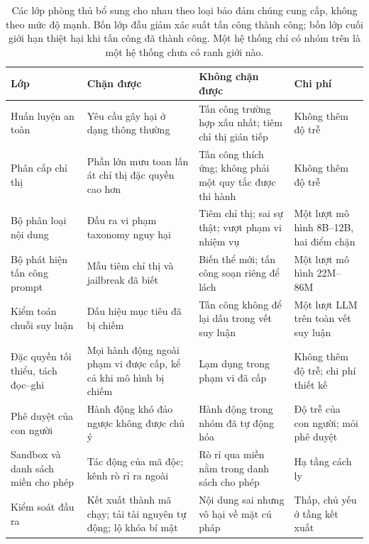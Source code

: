 \begin{table}[H]
\centering
\small
\begin{tabularx}{\textwidth}{>{\raggedright\arraybackslash}p{2.9cm} >{\raggedright\arraybackslash}X >{\raggedright\arraybackslash}X >{\raggedright\arraybackslash}p{2.6cm}}
\toprule
\textbf{Lớp} & \textbf{Chặn được} & \textbf{Không chặn được} & \textbf{Chi phí} \\
\midrule
Huấn luyện an toàn & Yêu cầu gây hại ở dạng thông thường & Tấn công trường hợp xấu nhất; tiêm chỉ thị gián tiếp & Không thêm độ trễ \\
\addlinespace
Phân cấp chỉ thị & Phần lớn mưu toan lấn át chỉ thị đặc quyền cao hơn & Tấn công thích ứng; không phải một quy tắc được thi hành & Không thêm độ trễ \\
\addlinespace
Bộ phân loại nội dung & Đầu ra vi phạm taxonomy nguy hại & Tiêm chỉ thị; sai sự thật; vượt phạm vi nhiệm vụ & Một lượt mô hình 8B--12B, hai điểm chặn \\
\addlinespace
Bộ phát hiện tấn công prompt & Mẫu tiêm chỉ thị và jailbreak đã biết & Biến thể mới; tấn công soạn riêng để lách & Một lượt mô hình 22M--86M \\
\addlinespace
Kiểm toán chuỗi suy luận & Dấu hiệu mục tiêu đã bị chiếm & Tấn công không để lại dấu trong vết suy luận & Một lượt LLM trên toàn vết suy luận \\
\addlinespace
Đặc quyền tối thiểu, tách đọc--ghi & Mọi hành động ngoài phạm vi được cấp, kể cả khi mô hình bị chiếm & Lạm dụng trong phạm vi đã cấp & Không thêm độ trễ; chi phí thiết kế \\
\addlinespace
Phê duyệt của con người & Hành động khó đảo ngược không được chủ ý & Hành động trong nhóm đã tự động hóa & Độ trễ của con người; mỏi phê duyệt \\
\addlinespace
Sandbox và danh sách miền cho phép & Tác động của mã độc; kênh rò rỉ ra ngoài & Rò rỉ qua miền nằm trong danh sách cho phép & Hạ tầng cách ly \\
\addlinespace
Kiểm soát đầu ra & Kết xuất thành mã chạy; tải tài nguyên tự động; lộ khóa bí mật & Nội dung sai nhưng vô hại về mặt cú pháp & Thấp, chủ yếu ở tầng kết xuất \\
\bottomrule
\end{tabularx}
\caption{Các lớp phòng thủ bổ sung cho nhau theo loại bảo đảm chúng cung cấp, không theo mức độ mạnh. Bốn lớp đầu giảm xác suất tấn công thành công; bốn lớp cuối giới hạn thiệt hại khi tấn công đã thành công. Một hệ thống chỉ có nhóm trên là một hệ thống chưa có ranh giới nào.}
\label{tab:defense_layers}
\end{table}

